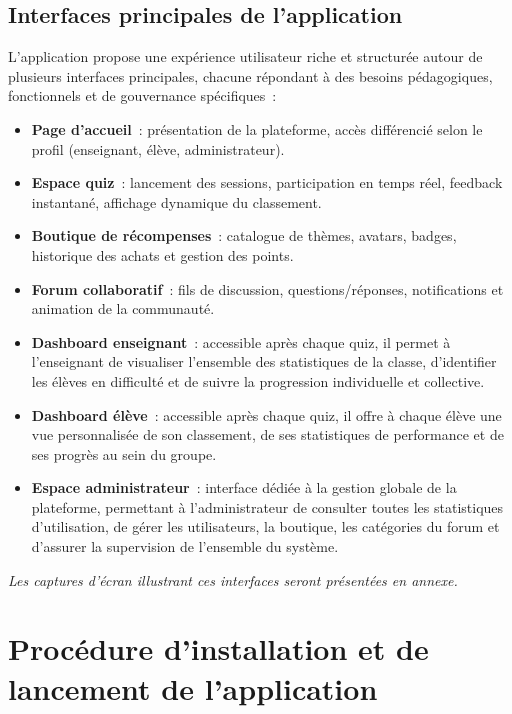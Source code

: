 \documentclass[a4paper,11pt]{report}
\begin{document}
\subsection{Interfaces principales de l'application}
L'application propose une expérience utilisateur riche et structurée autour de plusieurs interfaces principales, chacune répondant à des besoins pédagogiques, fonctionnels et de gouvernance spécifiques :
\begin{itemize}
    \item \textbf{Page d'accueil} : présentation de la plateforme, accès différencié selon le profil (enseignant, élève, administrateur).
    \item \textbf{Espace quiz} : lancement des sessions, participation en temps réel, feedback instantané, affichage dynamique du classement.
    \item \textbf{Boutique de récompenses} : catalogue de thèmes, avatars, badges, historique des achats et gestion des points.
    \item \textbf{Forum collaboratif} : fils de discussion, questions/réponses, notifications et animation de la communauté.
    \item \textbf{Dashboard enseignant} : accessible après chaque quiz, il permet à l'enseignant de visualiser l'ensemble des statistiques de la classe, d'identifier les élèves en difficulté et de suivre la progression individuelle et collective.
    \item \textbf{Dashboard élève} : accessible après chaque quiz, il offre à chaque élève une vue personnalisée de son classement, de ses statistiques de performance et de ses progrès au sein du groupe.
    \item \textbf{Espace administrateur} : interface dédiée à la gestion globale de la plateforme, permettant à l'administrateur de consulter toutes les statistiques d'utilisation, de gérer les utilisateurs, la boutique, les catégories du forum et d'assurer la supervision de l'ensemble du système.
\end{itemize}
\textit{Les captures d'écran illustrant ces interfaces seront présentées en annexe.}

\section{Procédure d'installation et de lancement de l'application}
\end{document}
